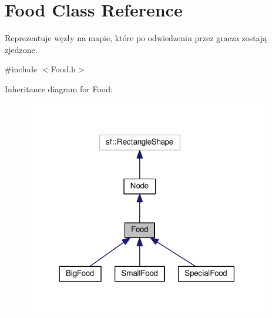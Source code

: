 \hypertarget{classFood}{}\section{Food Class Reference}
\label{classFood}


Reprezentuje węzły na mapie, które po odwiedzeniu przez gracza zostają \textquotesingle{}zjedzone\textquotesingle{}.  




{\ttfamily \#include $<$Food.\+h$>$}



Inheritance diagram for Food\+:\nopagebreak
\begin{figure}[H]
\begin{center}
\leavevmode
\includegraphics[width=303pt]{classFood__inherit__graph}
\end{center}
\end{figure}


